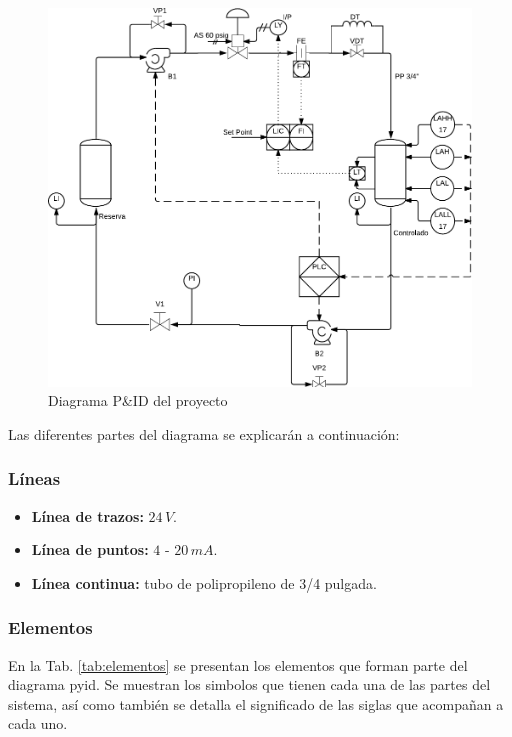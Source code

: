 \begin{figure}
	\centering
\includegraphics[width=\textwidth]{Cap2-DisenoEnsamblado/images/p&id.pdf}
	\caption{Diagrama P\&ID del proyecto}
	\label{img:pyid}
\end{figure}

Las diferentes partes del diagrama se explicarán a continuación:

\subsubsection{Líneas}

\begin{itemize}
 \item \textbf{Línea de trazos:} $24\,V$.
 \item \textbf{Línea de puntos:} $4$ - $20\,mA$.
 \item \textbf{Línea continua:} tubo de polipropileno de 3/4 pulgada.
\end{itemize}

\subsubsection{Elementos}

En la Tab. \ref{tab:elementos} se presentan los elementos
que forman parte del diagrama \gls{pyid}. Se muestran
los simbolos que tienen cada una de las partes del sistema, así como
también se detalla el significado de las siglas que acompañan a
cada uno.

